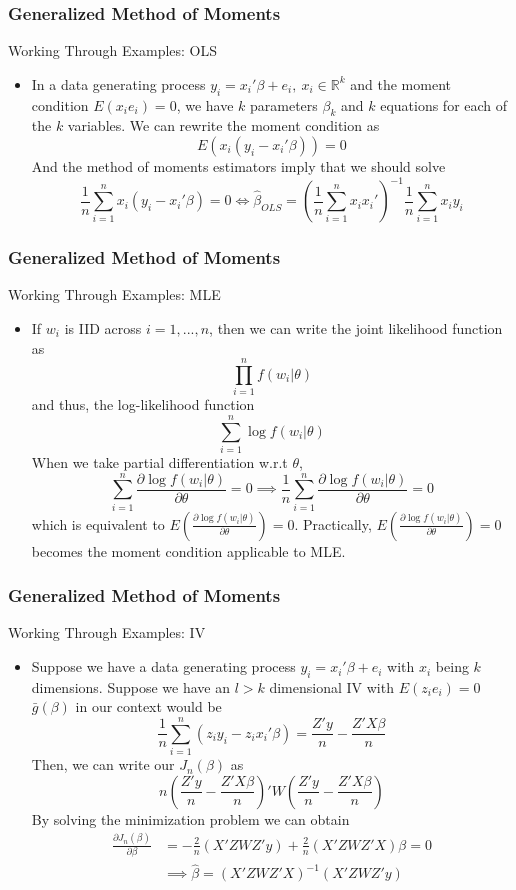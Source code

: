 \documentclass{beamer}
\begin{document}
\begin{frame}
\frametitle{Generalized Method of Moments}
Working Through Examples: OLS
\begin{itemize}
\item In a data generating process $y_i = x_i'\beta+e_i,\ x_i\in\mathbb{R}^k$ and the moment condition $E(x_ie_i)=0$, we have $k$ parameters $\beta_k$  and $k$ equations for each of the $k$ variables. We can rewrite the moment condition as
\[
E(x_i(y_i-x_i'\beta))=0
\]
And the method of moments estimators imply that we should solve 
\[
\frac{1}{n}\sum_{i=1}^nx_i(y_i-x_i'\beta)=0\iff \hat{\beta}_{OLS}=\left(\frac{1}{n}\sum_{i=1}^n x_ix_i'\right)^{-1}\frac{1}{n}\sum_{i=1}^n x_iy_i
\]

\end{itemize}
\end{frame}

\begin{frame}
\frametitle{Generalized Method of Moments}
Working Through Examples: MLE
\begin{itemize}
\item   If $w_i$ is IID across $i=1,...,n$, then we can write the joint likelihood function as
\[
\prod_{i=1}^nf(w_i|\theta)
\]
and thus, the log-likelihood function
\[
\sum_{i=1}^n \log f(w_i|\theta)
\]
When we take partial differentiation w.r.t $\theta$, 
\[
\sum_{i=1}^n \frac{\partial \log f(w_i|\theta)}{\partial \theta}=0 \implies \frac{1}{n}\sum_{i=1}^n \frac{\partial \log f(w_i|\theta)}{\partial \theta}=0 
\]
which is equivalent to $E\left(\frac{\partial \log f(w_i|\theta)}{\partial \theta}\right)=0$. Practically, $E\left(\frac{\partial \log f(w_i|\theta)}{\partial \theta}\right)=0$ becomes the moment condition applicable to MLE.
\end{itemize}
\end{frame}

\begin{frame}
\frametitle{Generalized Method of Moments}
Working Through Examples: IV
\begin{itemize}
\item Suppose we have a data generating process $y_i=x_i'\beta+e_i$ with $x_i$ being $k$ dimensions.  Suppose we have an $l>k$ dimensional IV with $E(z_ie_i)=0$  $\bar{g}(\beta)$ in our context would be
\[
\frac{1}{n}\sum_{i=1}^n(z_iy_i-z_ix_i'\beta) = \frac{Z'y}{n}-\frac{Z'X\beta}{n}
\]
Then, we can write our $J_n(\beta)$ as
\[
n\left(\frac{Z'y}{n}-\frac{Z'X\beta}{n} \right)'W\left(\frac{Z'y}{n}-\frac{Z'X\beta}{n} \right)
\]
By solving the minimization problem we can obtain
\[
\begin{aligned}
\frac{\partial J_n(\beta)}{\partial \beta}&=-\frac{2}{n}(X'ZWZ'y)+\frac{2}{n}(X'ZWZ'X)\beta=0\\
&\implies\hat{\beta}=(X'ZWZ'X)^{-1}(X'ZWZ'y)\\
\end{aligned}
\] 
\end{itemize}
\end{frame}
\end{document}
